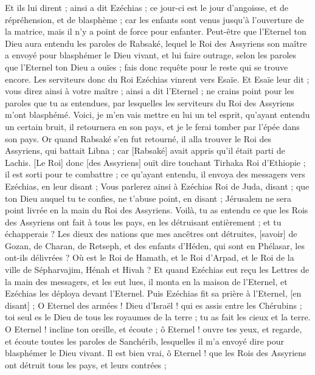 \begin{multicols}{2}
Et ils lui dirent ; ainsi a dit Ezéchias ; ce jour-ci est le jour d'angoisse, et de répréhension, et de blasphème ; car les enfants sont venus jusqu'à l'ouverture de la matrice, mais il n'y a point de force pour enfanter.
Peut-être que l'Eternel ton Dieu aura entendu les paroles de Rabsaké, lequel le Roi des Assyriens son maître a envoyé pour blasphémer le Dieu vivant, et lui faire outrage, selon les paroles que l'Eternel ton Dieu a ouïes ; fais donc requête pour le reste qui se trouve encore.
Les serviteurs donc du Roi Ezéchias vinrent vers Esaïe.
Et Esaïe leur dit ; vous direz ainsi à votre maître ; ainsi a dit l'Eternel ; ne crains point pour les paroles que tu as entendues, par lesquelles les serviteurs du Roi des Assyriens m'ont blasphémé.
Voici, je m'en vais mettre en lui un tel esprit, qu'ayant entendu un certain bruit, il retournera en son pays, et je le ferai tomber par l'épée dans son pays.
Or quand Rabsaké s'en fut retourné, il alla trouver le Roi des Assyriens, qui battait Libna ; car [Rabsaké] avait appris qu'il était parti de Lachis.
[Le Roi] donc [des Assyriens] ouït dire touchant Tirhaka Roi d'Ethiopie ; il est sorti pour te combattre ; ce qu'ayant entendu, il envoya des messagers vers Ezéchias, en leur disant ;
Vous parlerez ainsi à Ezéchias Roi de Juda, disant ; que ton Dieu auquel tu te confies, ne t'abuse point, en disant ; Jérusalem ne sera point livrée en la main du Roi des Assyriens.
Voilà, tu as entendu ce que les Rois des Assyriens ont fait à tous les pays, en les détruisant entièrement ; et tu échapperais ?
Les dieux des nations que mes ancêtres ont détruites, [savoir] de Gozan, de Charan, de Retseph, et des enfants d'Héden, qui sont en Phélasar, les ont-ils délivrées ?
Où est le Roi de Hamath, et le Roi d'Arpad, et le Roi de la ville de Sépharvajim, Hénah et Hivah ?
Et quand Ezéchias eut reçu les Lettres de la main des messagers, et les eut lues, il monta en la maison de l'Eternel, et Ezéchias les déploya devant l'Eternel.
Puis Ezéchias fit sa prière à l'Eternel, [en disant] ;
O Eternel des armées ! Dieu d'Israël ! qui es assis entre les Chérubins ; toi seul es le Dieu de tous les royaumes de la terre ; tu as fait les cieux et la terre.
O Eternel ! incline ton oreille, et écoute ; ô Eternel ! ouvre tes yeux, et regarde, et écoute toutes les paroles de Sanchérib, lesquelles il m'a envoyé dire pour blasphémer le Dieu vivant.
Il est bien vrai, ô Eternel ! que les Rois des Assyriens ont détruit tous les pays, et leurs contrées ;

\end{multicols}
